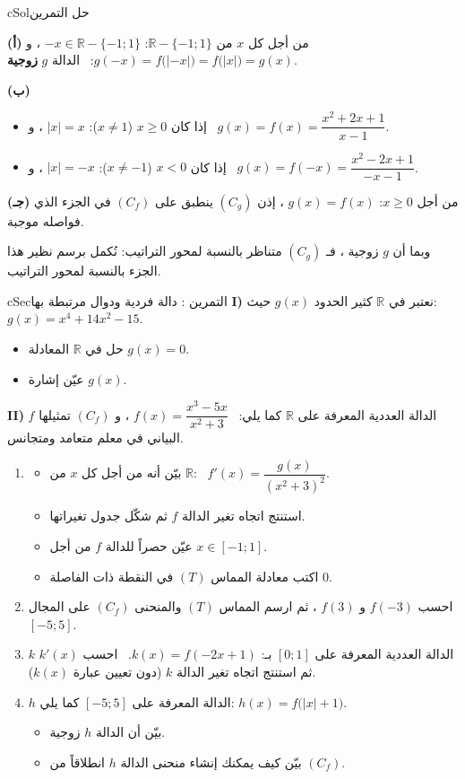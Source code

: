 \documentclass[12pt,a4paper]{article}
\newenvironment{BOX}[2]{\begin{otherlanguage}{english}\begin{arbox}{#1}{#2}}{\end{arbox}\end{otherlanguage}}
\newcounter{exo}
\newenvironment{tamrin}[1]{\stepcounter{exo}\begin{BOX}{cSec}{التمرين \theexo: #1}}{\end{BOX}}
\newenvironment{hal}{\Needspace{12\baselineskip}\begin{otherlanguage}{english}\begin{arbox}[breakable]{cSol}{حل التمرين \theexo}}{\end{arbox}\end{otherlanguage}}
\newcommand{\R}{\mathbb{R}}
\newenvironment{sq}{\begin{itemize}[leftmargin=2.4em,itemsep=3pt]}{\end{itemize}}
\newcommand{\qa}{\item[(أ)]}\newcommand{\qb}{\item[(ب)]}\newcommand{\qc}{\item[(جـ)]}\newcommand{\qd}{\item[(د)]}\newcommand{\qe}{\item[(هـ)]}
\newcommand{\pa}{\par\smallskip\textbf{(أ)} }\newcommand{\pb}{\par\smallskip\textbf{(ب)} }\newcommand{\pc}{\par\smallskip\textbf{(جـ)} }\newcommand{\pd}{\par\smallskip\textbf{(د)} }\newcommand{\pe}{\par\smallskip\textbf{(هـ)} }
\begin{document}
\begin{hal}
 \pa من أجل كل $x$ من $\R-\{-1;1\}$: $-x\in\R-\{-1;1\}$ ، و $g(-x)=f\big(|-x|\big)=f\big(|x|\big)=g(x)$: \ الدالة $g$ \textbf{زوجية}.
\pb \begin{itemize}
\item إذا كان $x\ge0$ ($x\ne1$): $|x|=x$ ، و \ $g(x)=f(x)=\dfrac{x^2+2x+1}{x-1}$.
\item إذا كان $x<0$ ($x\ne-1$): $|x|=-x$ ، و \ $g(x)=f(-x)=\dfrac{x^2-2x+1}{-x-1}$.
\end{itemize}
\pc من أجل $x\ge0$: $g(x)=f(x)$ ، إذن $(C_g)$ ينطبق على $(C_f)$ في الجزء الذي فواصله موجبة.\par
وبما أن $g$ زوجية ، فـ $(C_g)$ متناظر بالنسبة لمحور التراتيب: نُكمل برسم نظير هذا الجزء بالنسبة لمحور التراتيب.
\end{hal}

\begin{tamrin}{دالة فردية ودوال مرتبطة بها}
\textbf{I)} نعتبر في $\R$ كثير الحدود $g(x)$ حيث: $g(x)=x^4+14x^2-15$.
\begin{sq}
\qa حل في $\R$ المعادلة $g(x)=0$.
\qb عيّن إشارة $g(x)$.
\end{sq}
\textbf{II)} $f$ الدالة العددية المعرفة على $\R$ كما يلي: \ $f(x)=\dfrac{x^3-5x}{x^2+3}$ ، و $(C_f)$ تمثيلها البياني في معلم متعامد ومتجانس.
\begin{enumerate}
\item
\begin{sq}
\qa بيّن أنه من أجل كل $x$ من $\R$: \ $f'(x)=\dfrac{g(x)}{(x^2+3)^2}$.
\qb استنتج اتجاه تغير الدالة $f$ ثم شكّل جدول تغيراتها.
\qc عيّن حصراً للدالة $f$ من أجل $x\in[-1;1]$.
\qd اكتب معادلة المماس $(T)$ في النقطة ذات الفاصلة $0$.
\end{sq}
\item احسب $f(-3)$ و $f(3)$ ، ثم ارسم المماس $(T)$ والمنحنى $(C_f)$ على المجال $[-5;5]$.
\item $k$ الدالة العددية المعرفة على $[0;1]$ بـ: $k(x)=f(-2x+1)$. \ احسب $k'(x)$ ثم استنتج اتجاه تغير الدالة $k$ (دون تعيين عبارة $k(x)$).
\item $h$ الدالة المعرفة على $[-5;5]$ كما يلي: $h(x)=f\big(|x|+1\big)$.
\begin{sq}
\qa بيّن أن الدالة $h$ زوجية.
\qb بيّن كيف يمكنك إنشاء منحنى الدالة $h$ انطلاقاً من $(C_f)$.
\end{sq}
\end{enumerate}
\end{tamrin}
\end{document}

